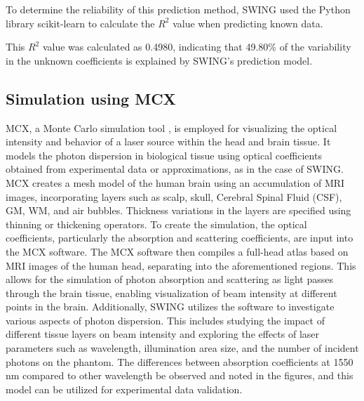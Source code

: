 \documentclass[journal,twoside,web]{ieeecolor}
\begin{document}
To determine the reliability of this prediction method, SWING used the Python library scikit-learn\cite{b7} 
to calculate the $R^2$ value when predicting known data. 

This $R^2$ value was calculated as 0.4980, indicating that 49.80\% of the variability in the unknown coefficients is 
explained by SWING's prediction model.



\subsection{Simulation using MCX}
MCX, a Monte Carlo simulation tool \cite{b6}, is employed for visualizing the optical intensity and behavior of a laser source within the head and brain tissue. 
It models the photon dispersion in biological tissue using optical coefficients obtained from experimental data or approximations, as in the case of SWING. 
MCX creates a mesh model of the human brain using an accumulation of MRI images, incorporating layers such as scalp, skull, Cerebral Spinal Fluid (CSF), GM, WM, 
and air bubbles. Thickness variations in the layers are specified using thinning or thickening operators. \cite{b9} To create the simulation, the optical coefficients, 
particularly the absorption and scattering coefficients, are input into the MCX software. The MCX software then compiles a full-head atlas based on MRI images of the human head, separating into the aforementioned regions. \cite {b10} This allows for the simulation of photon absorption and scattering as 
light passes through the brain tissue, enabling visualization of beam intensity at different points in the brain. Additionally, SWING utilizes the software to 
investigate various aspects of photon dispersion. This includes studying the impact of different tissue layers on beam intensity and exploring the effects of 
laser parameters such as wavelength, illumination area size, and the number of incident photons on the phantom. The differences between absorption coefficients at 
1550 nm compared to other wavelength be observed and noted in the figures, and this model can be utilized for experimental data validation.
\end{document}
